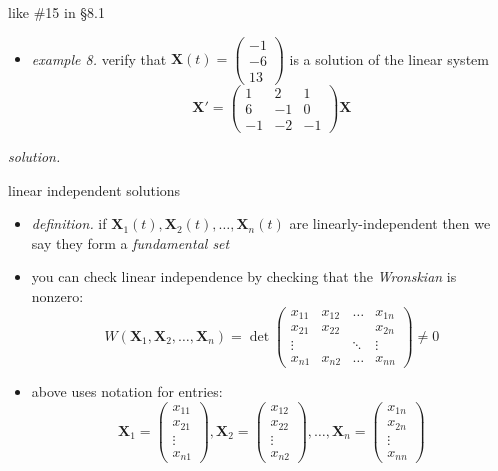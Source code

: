 \documentclass[dvipsnames,colorlinks]{beamer}
\newcommand{\bX}{\mathbf{X}}
\begin{document}
\begin{frame}{like \#15 in \S8.1}

\begin{itemize}
\item \emph{example 8.}  verify that $\displaystyle \bX(t)=\begin{pmatrix} -1 \\ -6 \\ 13 \end{pmatrix}$ is a solution of the linear system
    $$\bX' = \begin{pmatrix} 1 & 2 & 1 \\ 6 & -1 & 0 \\ -1 & -2 & -1 \end{pmatrix} \bX$$
\end{itemize}

\noindent \emph{solution.}

\vspace{35mm}
\end{frame}


\begin{frame}{linear independent solutions}

\begin{itemize}
\item \emph{definition.} if $\bX_1(t),\bX_2(t),\dots,\bX_n(t)$ are  linearly-independent then we say they form a \emph{fundamental set}
\item you can check linear independence by checking that the \emph{Wronskian} is nonzero:
    $$W\left(\bX_1,\bX_2,\dots,\bX_n\right) = \det \begin{pmatrix} x_{11} & x_{12} & \dots & x_{1n} \\ x_{21} & x_{22} &  & x_{2n} \\ \vdots & & \ddots & \vdots \\ x_{n1} & x_{n2} & \dots & x_{nn} \end{pmatrix} \ne 0$$
\item above uses notation for entries:
    $$\bX_1 = \begin{pmatrix} x_{11} \\ x_{21} \\ \vdots \\ x_{n1} \end{pmatrix}, \bX_2 = \begin{pmatrix} x_{12} \\ x_{22} \\ \vdots \\ x_{n2} \end{pmatrix}, \dots, \bX_n = \begin{pmatrix} x_{1n} \\ x_{2n} \\ \vdots \\ x_{nn} \end{pmatrix}$$
\end{itemize}
\end{frame}
\end{document}

